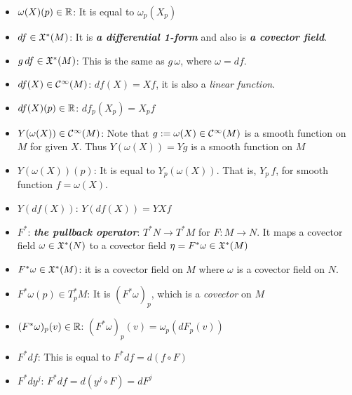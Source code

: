 \documentclass[11pt]{article}
\begin{document}
\begin{itemize}
\item $\omega(X)(p) \in {\mathbb R}$: \quad It is equal to $\omega_p(X_p)$

\item $df \in {\mathfrak X}^{*}(M)$: \quad It is \emph{\textbf{a differential 1-form}} and also is \emph{\textbf{a covector field}}.

\item $g\, df \in {\mathfrak X}^{*}(M)$: \quad This is the same as $g\,\omega$, where $\omega = df$.

\item $df(X) \in {\mathcal C}^{\infty}(M)$: \quad $df(X) = Xf$, it is also a \emph{linear function}.

\item $df(X)(p)  \in {\mathbb R}$: \quad $df_p(X_p) = X_pf$

\item $Y(\omega(X)) \in  {\mathcal C}^{\infty}(M)$: \quad Note that $g:= \omega(X) \in {\mathcal C}^{\infty}(M)$ is a smooth function on $M$ for given $X$. Thus $Y(\omega(X)) = Yg$ is a smooth function on $M$

\item $Y(\omega(X))(p)$: \quad It is equal to $Y_p(\omega(X))$. That is, $Y_p\,f$, for smooth function $f = \omega(X)$.

\item $Y(df(X))$: \quad $Y(df(X)) = YXf$

\item $F^{*}$: \quad  \emph{\textbf{the pullback operator}}: $T^{*}N \rightarrow T^{*}M$ for $F: M \rightarrow N$. It maps a covector field $\omega \in {\mathfrak X}^{*}(N)$ to a covector field $\eta = F^{*}\omega \in {\mathfrak X}^{*}(M)$

\item $F^{*}\omega \in {\mathfrak X}^{*}(M)$: \quad it is a covector field on $M$ where $\omega$ is a covector field on $N$.

\item $F^{*}\omega(p) \in T_p^{*}M$: \quad It is $(F^{*}\omega)_p$, which is a \emph{covector} on $M$

\item $(F^{*}\omega)_p(v) \in {\mathbb R}$: \quad $(F^{*}\omega)_p(v) = \omega_p(dF_p(v))$

\item $F^{*}df$: \quad This is equal to $F^{*}df = d(f \circ F)$

\item $F^{*}dy^j$: \quad $F^{*}df = d(y^j\circ F) = dF^{j}$
\end{itemize}
\end{document}
